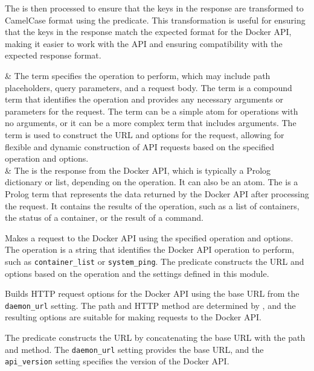 \begin{description}
The  is then processed to ensure that the keys in the response
are transformed to CamelCase format using the 
predicate. This transformation is useful for ensuring that the keys
in the response match the expected format for the Docker API, making
it easier to work with the API and ensuring compatibility with the
expected response format.

\begin{arguments}
 & The  term specifies the operation to perform, which may
include path placeholders, query parameters, and a request body. The 
term is a compound term that identifies the operation and provides any
necessary arguments or parameters for the request. The  term can be a
simple atom for operations with no arguments, or it can be a more complex
term that includes arguments. The  term is used to construct the URL and
options for the request, allowing for flexible and dynamic construction of
API requests based on the specified
operation and options. \\
 & The  is the response from the Docker API, which is
typically a Prolog dictionary or list, depending on the operation. It can
also be an atom. The  is a Prolog term that represents the data
returned by the Docker API after processing the request. It contains the
results of the operation, such as a list of containers, the status of a
container, or the result of a command. \\
\end{arguments}

Makes a request to the Docker API using the specified operation and
options. The operation is a string that identifies the Docker API
operation to perform, such as \verb$container_list$ or \verb$system_ping$. The
predicate constructs the URL and options based on the operation and
the settings defined in this module.

Builds HTTP request options for the Docker API using the base URL from
the \verb$daemon_url$ setting. The path and HTTP method are determined by
, and the resulting options are suitable for making
requests to the Docker API.

The predicate constructs the URL by concatenating the base URL with
the path and method. The \verb$daemon_url$ setting provides the base URL,
and the \verb$api_version$ setting specifies the version of the Docker API.


\end{description}

